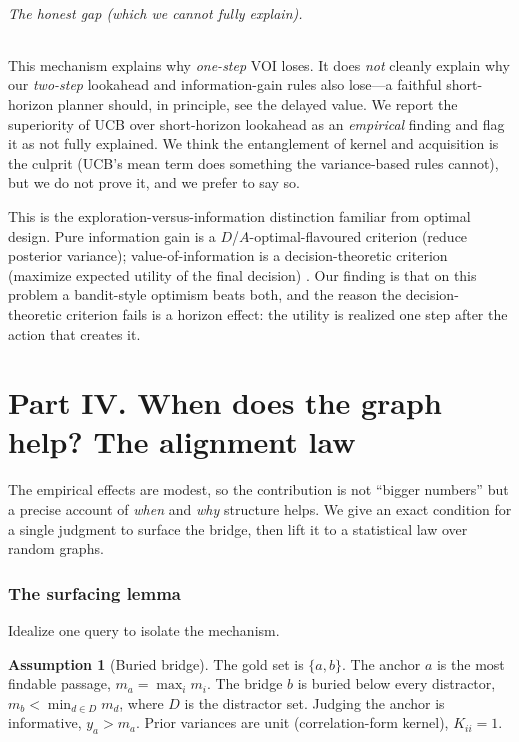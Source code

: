 \documentclass[11pt]{article}
\theoremstyle{plain}
\theoremstyle{definition}
\newtheorem{assumption}{Assumption}
\theoremstyle{remark}
\begin{document}
\paragraph{The honest gap (which we cannot fully explain).} This mechanism explains why \emph{one-step} VOI loses.
It does \emph{not} cleanly explain why our \emph{two-step} lookahead and information-gain rules also lose---a
faithful short-horizon planner should, in principle, see the delayed value. We report the superiority of UCB over
short-horizon lookahead as an \emph{empirical} finding and flag it as not fully explained. We think the entanglement
of kernel and acquisition is the culprit (UCB's mean term does something the variance-based rules cannot), but we do
not prove it, and we prefer to say so.

\begin{stats}
This is the exploration-versus-information distinction familiar from optimal design. Pure information gain is a
$D$/$A$-optimal-flavoured criterion (reduce posterior variance); value-of-information is a decision-theoretic
criterion (maximize expected utility of the final decision) \citep{chaloner1995bed,lindley1956voi}. Our finding is
that on this problem a bandit-style optimism beats both, and the reason the decision-theoretic criterion fails is a
horizon effect: the utility is realized one step after the action that creates it.
\end{stats}

\part*{Part IV. When does the graph help? The alignment law}

The empirical effects are modest, so the contribution is not ``bigger numbers'' but a precise account of
\emph{when} and \emph{why} structure helps. We give an exact condition for a single judgment to surface the bridge,
then lift it to a statistical law over random graphs.

\section{The surfacing lemma}\label{sec:surface}
Idealize one query to isolate the mechanism.
\begin{assumption}[Buried bridge]\label{ass:bridge}
The gold set is $\{a,b\}$. The anchor $a$ is the most findable passage, $m_a=\max_i m_i$. The bridge $b$ is buried
below every distractor, $m_b<\min_{d\in D}m_d$, where $D$ is the distractor set. Judging the anchor is informative,
$y_a>m_a$. Prior variances are unit (correlation-form kernel), $K_{ii}=1$.
\end{assumption}
\end{document}
